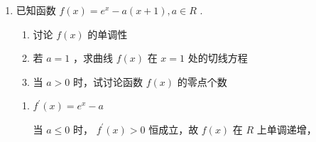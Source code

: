 \begin{enumerate}
\begin{enumerate}
\begin{jieda}
\begin{enumerate}
                又因为 $f\left( x\right)$ 在 $\left( {0,\pi }\right)$ 单调递减，根据零点存在定理 $f\left( x\right)$ 在 $\left( {0,\pi }\right)$ 有唯一零点.
                
                令 $f''\left( x\right)  =  - \dfrac{1}{{\left( 1 + x\right) }^{2}} - \cos x$，当 $x \in  \left( {-1,0}\right)$ 时， $f''\left( x\right)  < 0$ ，${f}^{\prime }\left( x\right)$ 在 $\left( {-1,0}\right)$ 上单调递减，又因为 ${f}^{\prime }\left( 0\right)  = 0$ ,当 $x \in  \left( {-1,0}\right)$ 时 ${f}^{\prime }\left( x\right)  > 0$ ,即 $f\left( x\right)$ 在 $\left( {-1,0}\right)$ 单调递增,
                
                因此 $f\left( x\right)$ 在 $\left( {-1,0}\right)$ 单调递增,在 $\left( {0,\pi }\right)$ 单调递减.
                
                当 $x \Longrightarrow   - 1$ 时, $\ln \left( {1 + x}\right)  \Longrightarrow   - \infty ,f\left( x\right)  < 0;f\left( 0\right)  = 1$ ,因为 $f\left( x\right)$ 在 $\left( {-1,0}\right)$ 单调递增,
                
                所以根据零点存在定理, $f\left( x\right)$ 在 $x \in  \left( {-1,0}\right)$ 有唯一零点;
                
                综上, $f\left( x\right)$ 在 $\left( {-1,\pi }\right)$ 上有 2 个零点.
            \end{enumerate}
        \end{jieda}
        
        \item 已知函数 $f\left( x\right)  = {{e}}^{x} - a\left( {x + 1}\right) ,a \in  {R}$ .
        \begin{enumerate}
            \item 讨论 $f\left( x\right)$ 的单调性
            \item 若 $a = 1$ ，求曲线 $f\left( x\right)$ 在 $x = 1$ 处的切线方程
            \item 当 $a > 0$ 时，试讨论函数 $f\left( x\right)$ 的零点个数
        \end{enumerate}

        \begin{jieda}
            \begin{enumerate}
                \item ${f}^{\prime }\left( x\right)  = {{e}}^{x} - a$
                
                当 $a \leq  0$ 时， ${f}^{\prime }\left( x\right)  > 0$ 恒成立，故 $f\left( x\right)$ 在 ${R}$ 上单调递增，
                

\end{enumerate}
\end{jieda}
\end{enumerate}
\end{enumerate}
